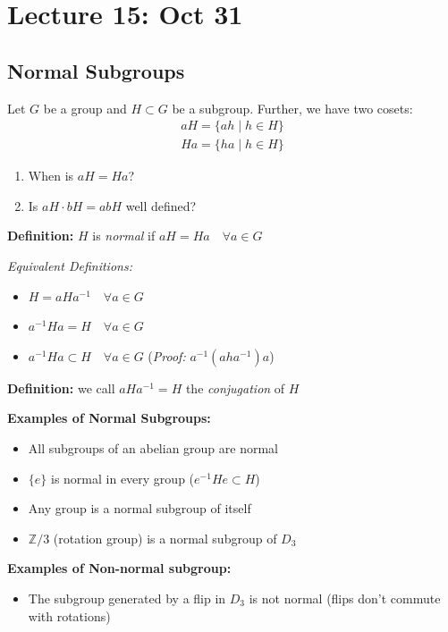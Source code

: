 \documentclass[12pt]{report}
\newcommand{\Z}{\mathbb{Z}}
\begin{document}
\section*{Lecture 15: Oct 31}
    \subsection*{Normal Subgroups}
        Let $G$ be a group and $H \subset G$ be a subgroup. Further, we have two cosets:
        \begin{gather*}
            aH = \{ah \; | \; h \in H\}\\
            Ha = \{ha \; | \; h \in H\}
        \end{gather*}

        \begin{enumerate}
            \item When is $aH = Ha$? 
            \item Is $aH \cdot bH = abH$ well defined?
        \end{enumerate}

        \textbf{Definition:} $H$ is \emph{normal} if $aH = Ha \quad \forall a \in G$

        \emph{Equivalent Definitions:} 
        \begin{itemize}
            \item $H = aHa^{-1} \quad \forall a \in G$
            \item $a^{-1} H a = H \quad \forall a \in G$
            \item $a^{-1}Ha \subset H \quad \forall a \in G$ (\emph{Proof:} $a^{-1}(aha^{-1})a$)
        \end{itemize}

        \textbf{Definition:} we call $aH a^{-1} = H$ the \emph{conjugation} of $H$

        \textbf{Examples of Normal Subgroups:}
        \begin{itemize}
            \item All subgroups of an abelian group are normal 
            \item $\{e\}$ is normal in every group ($e^{-1}He \subset H$)
            \item Any group is a normal subgroup of itself
            \item $\Z/3$ (rotation group) is a normal subgroup of $D_3$
        \end{itemize}

        \textbf{Examples of Non-normal subgroup:}
        \begin{itemize}
            \item The subgroup generated by a flip in $D_3$ is not normal (flips don't commute with rotations)
        \end{itemize}
\end{document}
